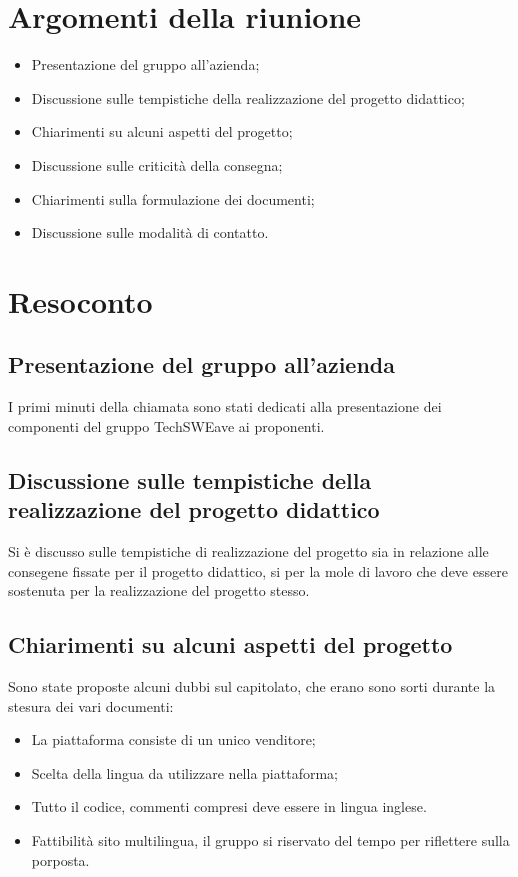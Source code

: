 \documentclass[a4paper]{article}
\begin{document}
\section{Argomenti della riunione}
\begin{itemize}
    \item Presentazione del gruppo all'azienda;
    \item Discussione sulle tempistiche della realizzazione del progetto didattico;
    \item Chiarimenti su alcuni aspetti del progetto;
    \item Discussione sulle criticità della consegna;
    \item Chiarimenti sulla formulazione dei documenti;
    \item Discussione sulle modalità di contatto.
\end{itemize}
\section{Resoconto}
\subsection{Presentazione del gruppo all'azienda}
I primi minuti della chiamata sono stati dedicati alla presentazione dei componenti del gruppo TechSWEave ai proponenti.
\subsection{Discussione sulle tempistiche della realizzazione del progetto didattico}
Si è discusso sulle tempistiche di realizzazione del progetto sia in relazione alle consegene fissate per il progetto didattico, si per la mole di lavoro che deve essere sostenuta per la realizzazione del progetto stesso.
\subsection{Chiarimenti su alcuni aspetti del progetto}
Sono state proposte alcuni dubbi sul capitolato, che erano sono sorti durante la stesura dei vari documenti:
\begin{itemize}
    \item La piattaforma consiste di un unico venditore;
    \item Scelta della lingua da utilizzare nella piattaforma;
    \item Tutto il codice, commenti compresi deve essere in lingua inglese.
    \item Fattibilità sito multilingua, il gruppo si riservato del tempo per riflettere sulla porposta.
\end{itemize}
\end{document}
